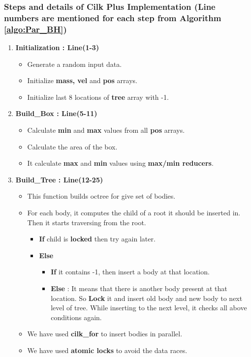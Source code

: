 \documentclass{article}
\begin{document}
\subsubsection{Steps and details of Cilk Plus Implementation (Line numbers are mentioned for each step from Algorithm \ref{algo:Par_BH})}

\begin{enumerate}

\item \textbf{Initialization : Line(1-3)}
\begin{itemize}
\item Generate a random input data.
\item Initialize \textbf{mass, vel} and \textbf{pos} arrays.
\item Initialize last 8 locations of \textbf{tree} array with -1.
\end{itemize}

\item \textbf{Build\_Box : Line(5-11)}
\begin{itemize}
\item Calculate \textbf{min} and \textbf{max} values from all \textbf{pos} arrays.
\item Calculate the area of the box.
\item It calculate \textbf{max} and \textbf{min} values using \textbf{max/min reducers}.
\end{itemize}

\item \textbf{Build\_Tree : Line(12-25)}
\begin{itemize}
\item This function builds octree for give set of bodies.
\item For each body, it computes the child of a root it should be inserted in. Then it starts traversing from the root. 
\begin{itemize}
\item \textbf{If} child is \textbf{locked} then try again later.
\item \textbf{Else} 
\begin{itemize}
\item \textbf{If} it contains -1, then insert a body at that location.
\item \textbf{Else} : It means that there is another body present at that location. So \textbf{Lock} it and insert old body and new body to next level of tree. While inserting to the next level, it checks all above conditions again.
\end{itemize}
\end{itemize}  
\item We have used \textbf{cilk\_for} to insert bodies in parallel.
\item We have used \textbf{atomic locks} to avoid the data races.
\end{itemize}


\end{enumerate}
\end{document}

